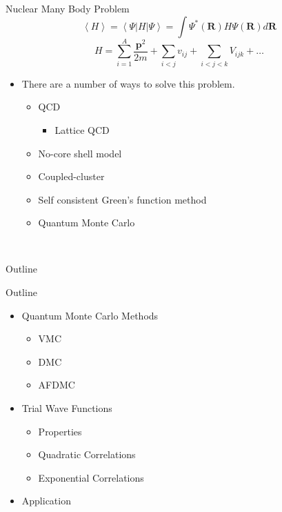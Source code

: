 \documentclass{beamer}
\newcommand{\red}[1]{{\color{red}{#1}}}
\newcommand{\ket}[1]{\left| #1 \right>}
\newcommand{\bra}[1]{\left< #1 \right|}
\begin{document}
\begin{frame}{Nuclear Many Body Problem}
   \begin{equation*}
      \left<H\right> = \bra{\Psi}H\ket{\Psi} = \int\Psi^*(\bm{R})H\Psi(\bm{R}) d\bm{R}
   \end{equation*}
   \begin{equation*}
      H = \sum\limits_{i=1}^A \frac{\bm{p}^2}{2m} + \sum\limits_{i<j} v_{ij} + \sum\limits_{i<j<k} V_{ijk} + \ldots
   \end{equation*}
   \begin{itemize}
      \item There are a number of ways to solve this problem.
      \begin{itemize}
         \item QCD
         \begin{itemize}
            \item Lattice QCD
         \end{itemize}
         \item No-core shell model
         \item Coupled-cluster
         \item Self consistent Green's function method
         \item Quantum Monte Carlo
      \end{itemize}
   \end{itemize}
   \red{Should I have a slide for each method or should I have some popup information about each and just describe them here?}
   \\\red{Can they be clumped into different styles and talked about together on slides?}
\end{frame}

\begin{frame}{Outline}
  \tableofcontents
\end{frame}
\fi

\begin{frame}{Outline}
\begin{itemize}
   \item Quantum Monte Carlo Methods
   \begin{itemize}
      \item VMC
      \item DMC
      \item AFDMC
   \end{itemize}
   \item Trial Wave Functions
   \begin{itemize}
      \item Properties
      \item Quadratic Correlations
      \item Exponential Correlations
   \end{itemize}
   \item Application
\end{itemize}
\end{frame}
\end{document}
